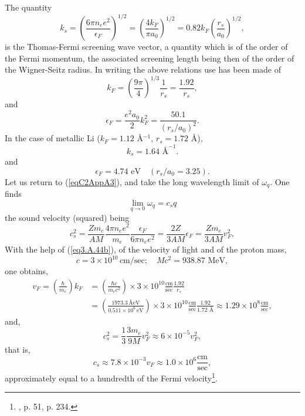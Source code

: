 The quantity
\begin{equation}\label{eq3.A.43}
k_s=\left(\frac{6\pi n_ee^2}{\epsilon_F}\right)^{1/2}=\left(\frac{4k_F}{\pi a_0}\right)^{1/2}=0.82 k_F\left(\frac{r_s}{a_0}\right)^{1/2},
\end{equation}
is the Thomas-Fermi screening wave vector, a quantity which is of the order of the Fermi momentum, the associated screening length being then of the order of the Wigner-Seitz radius. In writing the above relations use has been made of
\begin{equation}\label{eq3.A.44b}
k_F=\left(\frac{9\pi}{4}\right)^{1/3}\frac{1}{r_s}=\frac{1.92}{r_s},
\end{equation}
and
\begin{equation}\label{eq3.A.44}
\epsilon_F=\frac{e^2a_0}{2}k_F^2=\frac{50.1}{(r_s/a_0)^2}.
\end{equation}
 In the case of metallic Li ($k_F=1.12$ \AA$^{-1}$, $r_s=1.72$ \AA),
\begin{equation}\label{eq3.A.45}
k_s=1.64\text{ \AA}^{-1}.
\end{equation}
and
\begin{equation}\label{eq4.8.46}
\epsilon_F=4.74\text{ eV}\quad(r_s/a_0=3.25).
\end{equation}
 Let us return to (\ref{eqC2AppA3}), and take the long wavelength limit of $\omega_q$. One finds
\begin{equation}\label{eq3.A.46}
\lim_{q\to0}\omega_q=c_sq
\end{equation}
 the sound velocity (squared) being 
\begin{equation}\label{eqC2AppA8}
c_s^2=\frac{Zm_e}{AM}\frac{4\pi n_ee^2}{m_e}\frac{\epsilon_F}{6\pi n_e e^2}=\frac{2Z}{3 AM}\epsilon_F=\frac{Zm_e}{3 AM}v_F^2,
\end{equation}
With the help of (\ref{eq3.A.44b}), of the velocity of light and of the proton mass,
\begin{equation}\label{eqC2AppA10}
c=3\times 10^{10}\,\text{cm/sec};\quad Mc^2=938.87\text{ MeV},
\end{equation}
one obtains,
\begin{align}\label{eqC2AppA11}
\nonumber v_F=\left(\frac{\hbar}{m_e}\right)k_F&
=\left(\frac{\hbar c}{m_e c^2}\right)\times 3\times 10^{10}\frac{\text{cm}}{\text{sec}}\frac{1.92}{r_s}\\
&=\left(\frac{1973.3\,\text{\AA eV}}{0.511\times 10^6\,\text{eV}}\right)\times 3\times 10^{10}\frac{\text{cm}}{\text{sec}}\frac{1.92}{1.72\text{ \AA}}
\approx 1.29\times 10^8 \frac{\text{cm}}{\text{sec}},
\end{align}
and,
\begin{equation}\label{eqC2AppA12}
c_s^2=\frac{1}{3}\frac{3m_e}{9M}v_F^2\approx 6\times 10^{-5}v_F^2,
\end{equation}
that is,
\begin{equation}\label{eqC2AppA13}
c_s\approx 7.8\times 10^{-3}v_F\approx 1.0\times 10^6 \frac{\text{cm}}{\text{sec}},
\end{equation}
approximately equal to a hundredth of the Fermi velocity\footnote{\cite{Ashcroft:87}, p. 51, \cite{Ketterson:99} p. 234.}.



